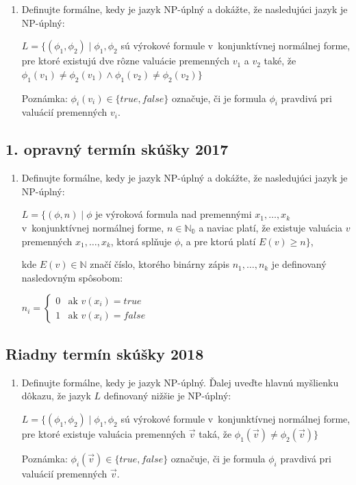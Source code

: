 \documentclass[11pt,a4paper]{article}
\begin{document}
		\begin{enumerate}
			\item Definujte formálne, kedy je jazyk NP-úplný a dokážte, že nasledujúci jazyk je NP-úplný:
	
			$L = \{(\phi_1, \phi_2) \mid \phi_1, \phi_2$ sú výrokové formule v~konjunktívnej normálnej forme, pre ktoré existujú dve rôzne valuácie premenných $v_1$ a $v_2$ také, že $\phi_1(v_1) \neq \phi_2(v_1) \land \phi_1(v_2) \neq \phi_2(v_2)\}$
	
			Poznámka: $\phi_i(v_i) \in \{true, false\}$ označuje, či je formula $\phi_i$ pravdivá pri valuácií premenných $v_i$.
		\end{enumerate}	

		\subsection{1. opravný termín skúšky 2017}

		\begin{enumerate}
			\item Definujte formálne, kedy je jazyk NP-úplný a dokážte, že nasledujúci jazyk je NP-úplný:

			$L = \{(\phi, n) \mid \phi$ je výroková formula nad premennými $x_1, \ldots, x_k$ v~konjunktívnej normálnej forme, $n \in \mathbb{N_0}$ a naviac platí, že existuje valuácia $v$ premenných $x_1, \ldots, x_k$, ktorá splňuje $\phi$, a pre ktorú platí $E(v) \geq n\}$,
	
			kde $E(v) \in \mathbb{N}$ značí číslo, ktorého binárny zápis $n_1, \ldots, n_k$ je definovaný nasledovným spôsobom:
	
			$n_i =
			\left\{
			\begin{array}{ll}
				0  & \mbox{ak } v(x_i) = true \\
				1 & \mbox{ak } v(x_i) = false
			\end{array}
			\right.$
		\end{enumerate}	

		\subsection{Riadny termín skúšky 2018}

		\begin{enumerate}
			\item Definujte formálne, kedy je jazyk NP-úplný. Ďalej uveďte hlavnú myšlienku dôkazu, že jazyk $L$ definovaný nižšie je NP-úplný:

			$L = \{(\phi_1, \phi_2) \mid \phi_1, \phi_2$ sú výrokové formule v~konjunktívnej normálnej forme, pre ktoré existuje valuácia premenných $\vec{v}$ taká, že $\phi_1(\vec{v}) \neq \phi_2(\vec{v})\}$
	
			Poznámka: $\phi_i(\vec{v}) \in \{true, false\}$ označuje, či je formula $\phi_i$ pravdivá pri valuácií premenných $\vec{v}$.
		\end{enumerate}	
	
\end{document}
